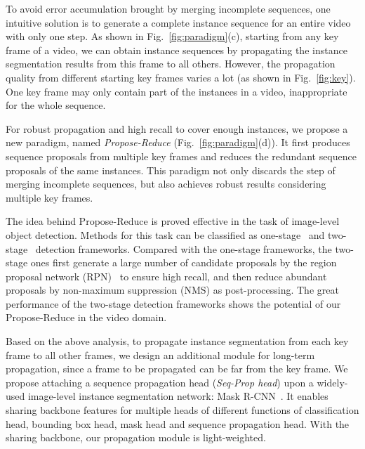 \documentclass[10pt,twocolumn,letterpaper]{article}
\begin{document}
	To avoid error accumulation brought by merging incomplete sequences, one intuitive solution is to generate a complete instance sequence for an entire video with only one step. As shown in Fig.~\ref{fig:paradigm}(c), starting from any key frame of a video, we can obtain instance sequences by propagating the instance segmentation results from this frame to all others. However, the propagation quality from different starting key frames varies a lot (as shown in Fig.~\ref{fig:key}). 
	One key frame may only contain part of the instances in a video, inappropriate for the whole sequence.
	
	For robust propagation and high recall to cover enough instances, we propose a new paradigm, named \textit{Propose-Reduce} (Fig.~\ref{fig:paradigm}(d)). It first produces sequence proposals from multiple key frames and reduces the redundant sequence proposals of the same instances. This paradigm not only discards the step of merging incomplete sequences, but also achieves robust results considering multiple key frames. 
	
	The idea behind Propose-Reduce is proved effective in the task of image-level object detection. 
	Methods for this task can be classified as one-stage~\cite{redmon2016you,liu2016ssd} and two-stage~\cite{ren2015faster,lin2017feature} detection frameworks. Compared with the one-stage frameworks, the two-stage ones first generate a large number of candidate proposals by the region proposal network (RPN)~\cite{ren2015faster} to ensure high recall, and then reduce abundant proposals by non-maximum suppression (NMS) as post-processing. 
	The great performance of the two-stage detection frameworks shows the potential of our {Propose-Reduce} in the video domain.
	
	
	Based on the above analysis, to propagate instance segmentation from each key frame to all other frames, 
	we design an additional module for long-term propagation, since a frame to be propagated can be far from the key frame.
	We propose attaching a sequence propagation head ({\it Seq-Prop head}) upon a widely-used image-level instance segmentation network: Mask R-CNN~\cite{he2017mask}. It enables sharing backbone features for multiple heads of different functions of 
	classification head, bounding box head, mask head and sequence propagation head. With the sharing backbone, our propagation module is light-weighted. 
	
\end{document}

